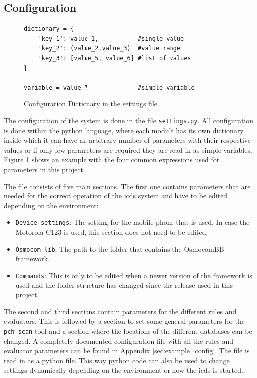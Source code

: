\subsection{Configuration}
\label{sec:configuration}
\begin{figure}
\hspace*{\dimexpr\fboxsep+\fboxrule}%
\begin{minipage}{\dimexpr\textwidth-4\fboxsep-2\fboxrule} 
\begin{lstlisting}
dictionary = {
	'key_1': value_1,           #single value
	'key_2': (value_2,value_3)  #value range
	'key_3': [value_5, value_6] #list of values
}

variable = value_7              #simple variable
\end{lstlisting}
\end{minipage}
\caption{Configuration Dictionary in the settings file.}
\label{fig:python_dict}
\end{figure}
The configuration of the system is done in the file \texttt{settings.py}.
All configuration is done within the python language, where each module has its own dictionary inside which it can have an arbitrary number of parameters with their respective values or if only few parameters are required they are read in as simple variables.
Figure \ref{fig:python_dict} shows an example with the four common expressions used for parameters in this project.

The file consists of five main sections.
The first one contains parameters that are needed for the correct operation of the \gls{icds} system and have to be edited depending on the environment:
\begin{itemize}
	\item \texttt{Device\_settings}: The setting for the mobile phone that is used.
	In case the Motorola C123 is used, this section does not need to be edited.
	\item \texttt{Osmocom\_lib}: The path to the folder that contains the OsmocomBB framework.
	\item \texttt{Commands}: This is only to be edited when a newer version of the framework is used and the folder structure has changed since the release used in this project.
\end{itemize}
The second and third sections contain parameters for the different rules and evaluators.
This is followed by a section to set some general parameters for the \texttt{pch\_scan} tool and a section where the locations of the different databases can be changed.
A completely documented configuration file with all the rules and evaluator parameters can be found in Appendix \ref{sec:example_config}.
The file is read in as a python file.
This way python code can also be used to change settings dynamically depending on the environment or how the \gls{icds} is started.

